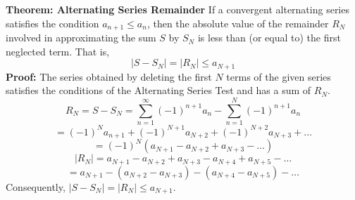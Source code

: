 \nopagenumbers
{\bf Theorem: Alternating Series Remainder}
\vskip 6pt
If a convergent alternating series satisfies the condition $a_{n+1} \leq a_n$, then the absolute value of the remainder $R_N$ involved in approximating the sum $S$ by $S_N$ is less than (or equal to) the first neglected term. That is, $$|S-S_N|=|R_N| \leq a_{N+1}$$
\vskip 10pt
{\bf Proof:}
\vskip 6pt
The series obtained by deleting the first $N$ terms of the given series satisfies the conditions of the Alternating Series Test and has a sum of $R_N$.
$$R_N=S-S_N=\sum_{n=1}^\infty(-1)^{n+1}a_n-\sum_{n=1}^N(-1)^{n+1}a_n$$
$$=(-1)^Na_{n+1}+(-1)^{N+1}a_{N+2}+(-1)^{N+2}a_{N+3}+\ldots$$
$$=(-1)^N(a_{N+1}-a_{N+2}+a_{N+3}-\ldots)$$
$$|R_N|=a_{N+1}-a_{N+2}+a_{N+3}-a_{N+4}+a_{N+5}-\ldots$$
$$=a_{N+1}-(a_{N+2}-a_{N+3})-(a_{N+4}-a_{N+5})-\ldots$$
Consequently, $|S-S_N|=|R_N|\leq a_{N+1}$.



\vfill\eject
